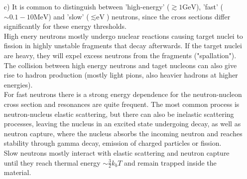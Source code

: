 \documentclass[10pt,a4paper]{article}
\newcommand{\mev}{\si{\mega\electronvolt}}
\newcommand{\gev}{\si{\giga\electronvolt}}
\begin{document}
\begin{enumerate}
\item[c)] It is common to distinguish between 'high-energy' ($\gtrsim1\gev$), 'fast' ($\sim 0.1 - 10 \mev$) and 'slow' ($\lesssim \si{\electronvolt}$) neutrons, since the cross sections differ significantly for these energy thresholds. \\
High enery neutrons mostly undergo nuclear reactions causing target nuclei to fission in highly unstable fragments that decay afterwards. If the target nuclei are heavy, they will expel excess neutrons from the fragments ("spallation"). The collision between high energy neutrons and taget nucleons can also give rise to hadron production (mostly light pions, also heavier hadrons at higher energies).\\
For fast neutrons there is a strong energy dependence for the neutron-nucleon cross section and resonances are quite frequent. The most common process is neutron-nucleus elastic scattering, but there can also be inelastic scattering processes, leaving the nucleus in an excited state undergoing decay, as well as neutron capture, where the nucleus absorbs the incoming neutron and reaches stability through gamma decay, emission of charged particles or fission.\\
Slow neutrons mostly interact with elastic scattering and neutron capture until they reach thermal energy $\sim\frac{3}{2}k_bT$ and remain trapped inside the material.

  

\end{enumerate}
\end{document}
